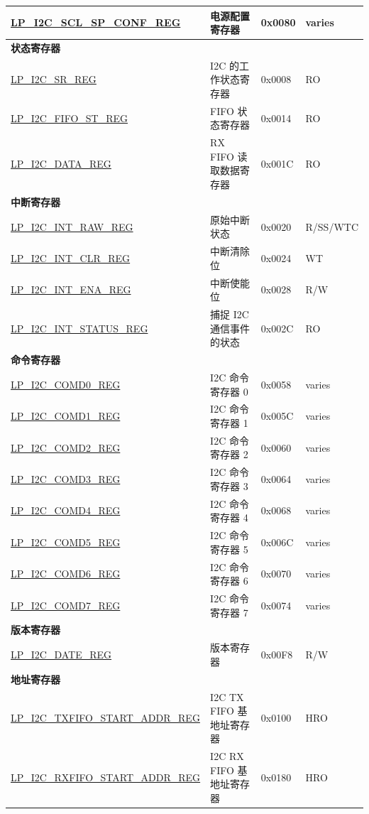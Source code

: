 \begin{longtable}{ | p{6cm} | p{7cm} | p{1.3cm} | p{1cm} | }
\hyperref[regdesc:LPI2CSCLSPCONFREG]{LP\_I2C\_SCL\_SP\_CONF\_REG} & 电源配置寄存器 & 0x0080 & varies \\ \hline
\multicolumn{4}{|l|}{\textbf{状态寄存器}} \\ \hline
\hyperref[regdesc:LPI2CSRREG]{LP\_I2C\_SR\_REG} & I2C 的工作状态寄存器 & 0x0008 & RO \\ \hline
\hyperref[regdesc:LPI2CFIFOSTREG]{LP\_I2C\_FIFO\_ST\_REG} & FIFO 状态寄存器 & 0x0014 & RO \\ \hline
\hyperref[regdesc:LPI2CDATAREG]{LP\_I2C\_DATA\_REG} & RX FIFO 读取数据寄存器 & 0x001C & RO \\ \hline
\multicolumn{4}{|l|}{\textbf{中断寄存器}} \\ \hline
\hyperref[regdesc:LPI2CINTRAWREG]{LP\_I2C\_INT\_RAW\_REG} & 原始中断状态 & 0x0020 & R/SS/WTC \\ \hline
\hyperref[regdesc:LPI2CINTCLRREG]{LP\_I2C\_INT\_CLR\_REG} & 中断清除位 & 0x0024 & WT \\ \hline
\hyperref[regdesc:LPI2CINTENAREG]{LP\_I2C\_INT\_ENA\_REG} & 中断使能位 & 0x0028 & R/W \\ \hline
\hyperref[regdesc:LPI2CINTSTATUSREG]{LP\_I2C\_INT\_STATUS\_REG} & 捕捉 I2C 通信事件的状态 & 0x002C & RO \\ \hline
\multicolumn{4}{|l|}{\textbf{命令寄存器}} \\ \hline
\hyperref[regdesc:LPI2CCOMD0REG]{LP\_I2C\_COMD0\_REG} & I2C 命令寄存器 0 & 0x0058 & varies \\ \hline
\hyperref[regdesc:LPI2CCOMD1REG]{LP\_I2C\_COMD1\_REG} & I2C 命令寄存器 1 & 0x005C & varies \\ \hline
\hyperref[regdesc:LPI2CCOMD2REG]{LP\_I2C\_COMD2\_REG} & I2C 命令寄存器 2 & 0x0060 & varies \\ \hline
\hyperref[regdesc:LPI2CCOMD3REG]{LP\_I2C\_COMD3\_REG} & I2C 命令寄存器 3 & 0x0064 & varies \\ \hline
\hyperref[regdesc:LPI2CCOMD4REG]{LP\_I2C\_COMD4\_REG} & I2C 命令寄存器 4 & 0x0068 & varies \\ \hline
\hyperref[regdesc:LPI2CCOMD5REG]{LP\_I2C\_COMD5\_REG} & I2C 命令寄存器 5 & 0x006C & varies \\ \hline
\hyperref[regdesc:LPI2CCOMD6REG]{LP\_I2C\_COMD6\_REG} & I2C 命令寄存器 6 & 0x0070 & varies \\ \hline
\hyperref[regdesc:LPI2CCOMD7REG]{LP\_I2C\_COMD7\_REG} & I2C 命令寄存器 7 & 0x0074 & varies \\ \hline
\multicolumn{4}{|l|}{\textbf{版本寄存器}} \\ \hline
\hyperref[regdesc:LPI2CDATEREG]{LP\_I2C\_DATE\_REG} & 版本寄存器 & 0x00F8 & R/W \\ \hline
\multicolumn{4}{|l|}{\textbf{地址寄存器}} \\ \hline
\hyperref[regdesc:LPI2CTXFIFOSTARTADDRREG]{LP\_I2C\_TXFIFO\_START\_ADDR\_REG} & I2C TX FIFO 基地址寄存器 & 0x0100 & HRO \\ \hline
\hyperref[regdesc:LPI2CRXFIFOSTARTADDRREG]{LP\_I2C\_RXFIFO\_START\_ADDR\_REG} & I2C RX FIFO 基地址寄存器 & 0x0180 & HRO \\ \hline
\end{longtable}
